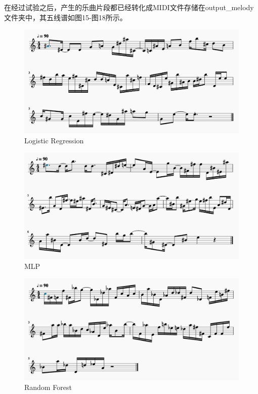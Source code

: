 \documentclass[UTF8,a4paper,10pt]{ctexart}
\begin{document}
    在经过试验之后，产生的乐曲片段都已经转化成MIDI文件存储在output\_melody文件夹中，其五线谱如图15-图18所示。
    \begin{figure}[H]
    \begin{center}
        \includegraphics[width=1.0\columnwidth]{output_logreg_melody.png}
        \caption{Logistic Regression}
    \end{center}
    \end{figure}

    \begin{figure}[H]
    \begin{center}
        \includegraphics[width=1.0\columnwidth]{output_mlp_melody.png}
        \caption{MLP}
    \end{center}
    \end{figure}

    \begin{figure}[H]
    \begin{center}
        \includegraphics[width=1.0\columnwidth]{output_forest_melody.png}
        \caption{Random Forest}
    \end{center}
    \end{figure}
\end{document}

